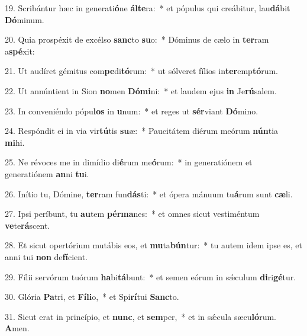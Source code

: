 19. Scribántur hæc in generati\textbf{ó}ne \textbf{ál}\textbf{te}ra:~*  et pópulus qui creábitur, lau\textbf{dá}bit \textbf{Dó}minum.\

20. Quia prospéxit de excélso \textbf{sanc}to \textbf{su}o:~*  Dóminus de cælo in \textbf{ter}ram a\textbf{spé}xit:\

21. Ut audíret gémitus com\textbf{pe}di\textbf{tó}rum:~*  ut sólveret fílios in\textbf{ter}emp\textbf{tó}rum.\

22. Ut annúntient in Sion \textbf{no}men \textbf{Dó}\textbf{mi}ni:~*  et laudem ejus \textbf{in} Je\textbf{rú}salem.\

23. In conveniéndo pópu\textbf{los} in \textbf{u}num:~*  et reges ut \textbf{sér}viant \textbf{Dó}mino.\

24. Respóndit ei in via vir\textbf{tú}tis \textbf{su}æ:~*  Paucitátem diérum meórum \textbf{nún}tia \textbf{mi}hi.\

25. Ne révoces me in dimídio di\textbf{é}rum me\textbf{ó}rum:~*  in generatiónem et generatiónem \textbf{an}ni \textbf{tu}i.\

26. Inítio tu, Dómine, \textbf{ter}ram fun\textbf{dás}ti:~*  et ópera mánuum tu\textbf{á}rum sunt \textbf{cæ}li.\

27. Ipsi períbunt, tu \textbf{au}tem \textbf{pér}\textbf{ma}nes:~*  et omnes sicut vestiméntum \textbf{ve}te\textbf{rá}scent.\

28. Et sicut opertórium mutábis eos, et \textbf{mu}ta\textbf{bún}tur:~*  tu autem idem ipse es, et anni tui \textbf{non} de\textbf{fí}cient.\

29. Fílii servórum tuórum \textbf{ha}bi\textbf{tá}bunt:~*  et semen eórum in sǽculum \textbf{di}ri\textbf{gé}tur.\

30. Glória \textbf{Pa}tri, et \textbf{Fí}\textbf{li}o,~*  et Spi\textbf{rí}tui \textbf{Sanc}to.\

31. Sicut erat in princípio, et \textbf{nunc}, et \textbf{sem}per,~*  et in sǽcula sæcu\textbf{ló}rum. \textbf{A}men.\

